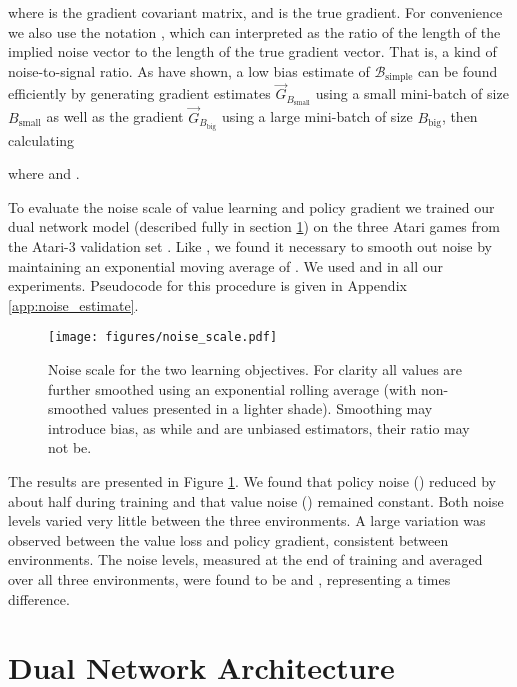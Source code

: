 \documentclass{article}
\newcommand{\gbs}[0]{\ensuremath{\vec{G}_{B_{\text{small}}}}\xspace}
\newcommand{\gbl}[0]{\ensuremath{\vec{G}_{B_{\text{big}}}}\xspace}
\newcommand{\bbs}[0]{\ensuremath{{B_{\text{small}}}}\xspace}
\newcommand{\bbb}[0]{\ensuremath{{B_{\text{big}}}}\xspace}
\newcommand{\bs}[0]{\ensuremath{\mathcal{B}_\text{simple}}\xspace}
\begin{document}
where  is the gradient covariant matrix, and  is the true gradient. For convenience we also use the notation , which can interpreted as the ratio of the length of the implied noise vector to the length of the true gradient vector. That is, a kind of noise-to-signal ratio. As \cite{mccandlish2018empirical} have shown, a low bias  estimate of \bs can be found efficiently by generating gradient estimates \gbs using a small mini-batch of size \bbs as well as the gradient \gbl using a large mini-batch of size \bbb, then calculating



where  and . 


To evaluate the noise scale of value learning and policy gradient we trained our dual network model (described fully in section \ref{sec:dna}) on the three Atari games from the Atari-3 validation set \cite{aitchison2022atari}. Like \cite{mccandlish2018empirical}, we found it necessary to smooth out noise by maintaining an exponential moving average of . We used  and  in all our experiments. Pseudocode for this procedure is given in Appendix \ref{app:noise_estimate}.



\begin{figure}[t]
    \centering
    \texttt{[image: figures/noise\_scale.pdf]}
    \caption{Noise scale for the two learning objectives. For clarity all values are further smoothed using an exponential rolling average (with non-smoothed values presented in a lighter shade). Smoothing may introduce bias, as while  and  are unbiased estimators, their ratio may not be.}
    \label{fig:noise_scale}
\end{figure}

The results are presented in Figure \ref{fig:noise_scale}. We found that policy noise () reduced by about half during training and that value noise () remained constant. Both noise levels varied very little between the three environments. A large variation was observed between the value loss and policy gradient, consistent between environments. The noise levels, measured at the end of training and averaged over all three environments, were found to be  and , representing a  times difference.

\section{Dual Network Architecture}
\label{sec:dna}
\end{document}
